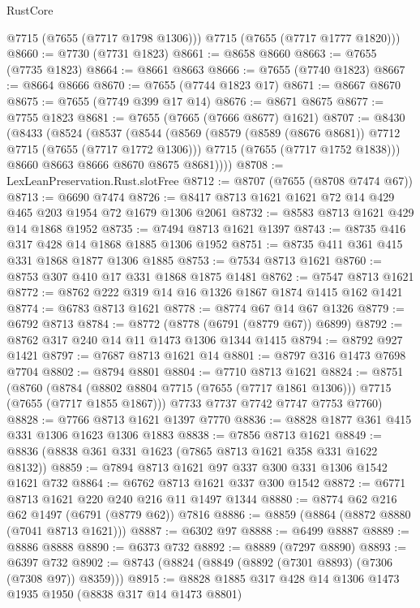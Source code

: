 \begin{lexlean}{RustCore}
\begin{coremodule}
        @7715
        (@7655 (@7717 @1798 @1306)))
      @7715
      (@7655 (@7717 @1777 @1820)))
@8660 := @7730 (@7731 @1823)
@8661 := @8658 @8660
@8663 := @7655 (@7735 @1823)
@8664 := @8661 @8663
@8666 := @7655 (@7740 @1823)
@8667 := @8664 @8666
@8670 := @7655 (@7744 @1823 @17)
@8671 := @8667 @8670
@8675 := @7655 (@7749 @399 @17 @14)
@8676 := @8671 @8675
@8677 := @7755 @1823
@8681 := @7655 (@7665 (@7666 @8677) @1621)
@8707 := @8430
    (@8433
      (@8524
        (@8537
          (@8544
            (@8569
              (@8579 (@8589 (@8676 @8681)) @7712 @7715 (@7655 (@7717 @1772 @1306)))
              @7715
              (@7655 (@7717 @1752 @1838)))
            @8660
            @8663
            @8666
            @8670
            @8675
            @8681))))
@8708 := LexLeanPreservation.Rust.slotFree
@8712 := @8707 (@7655 (@8708 @7474 @67))
@8713 := @6690 @7474
@8726 := @8417 @8713 @1621 @1621 @72 @14 @429 @465 @203 @1954 @72 @1679 @1306 @2061
@8732 := @8583 @8713 @1621 @429 @14 @1868 @1952
@8735 := @7494 @8713 @1621 @1397
@8743 := @8735 @416 @317 @428 @14 @1868 @1885 @1306 @1952
@8751 := @8735 @411 @361 @415 @331 @1868 @1877 @1306 @1885
@8753 := @7534 @8713 @1621
@8760 := @8753 @307 @410 @17 @331 @1868 @1875 @1481
@8762 := @7547 @8713 @1621
@8772 := @8762 @222 @319 @14 @16 @1326 @1867 @1874 @1415 @162 @1421
@8774 := @6783 @8713 @1621
@8778 := @8774 @67 @14 @67 @1326
@8779 := @6792 @8713
@8784 := @8772 (@8778 (@6791 (@8779 @67)) @6899)
@8792 := @8762 @317 @240 @14 @11 @1473 @1306 @1344 @1415
@8794 := @8792 @927 @1421
@8797 := @7687 @8713 @1621 @14
@8801 := @8797 @316 @1473 @7698 @7704
@8802 := @8794 @8801
@8804 := @7710 @8713 @1621
@8824 := @8751
    (@8760
      (@8784 (@8802 @8804 @7715 (@7655 (@7717 @1861 @1306))) @7715 (@7655 (@7717 @1855 @1867)))
      @7733
      @7737
      @7742
      @7747
      @7753
      @7760)
@8828 := @7766 @8713 @1621 @1397 @7770
@8836 := @8828 @1877 @361 @415 @331 @1306 @1623 @1306 @1883
@8838 := @7856 @8713 @1621
@8849 := @8836 (@8838 @361 @331 @1623 (@7865 @8713 @1621 @358 @331 @1622 @8132))
@8859 := @7894 @8713 @1621 @97 @337 @300 @331 @1306 @1542 @1621 @732
@8864 := @6762 @8713 @1621 @337 @300 @1542
@8872 := @6771 @8713 @1621 @220 @240 @216 @11 @1497 @1344
@8880 := @8774 @62 @216 @62 @1497 (@6791 (@8779 @62)) @7816
@8886 := @8859 (@8864 (@8872 @8880 (@7041 @8713 @1621)))
@8887 := @6302 @97
@8888 := @6499 @8887
@8889 := @8886 @8888
@8890 := @6373 @732
@8892 := @8889 (@7297 @8890)
@8893 := @6397 @732
@8902 := @8743 (@8824 (@8849 (@8892 (@7301 @8893) (@7306 (@7308 @97)) @8359)))
@8915 := @8828 @1885 @317 @428 @14 @1306 @1473 @1935 @1950 (@8838 @317 @14 @1473 @8801)

\end{coremodule}
\end{lexlean}
